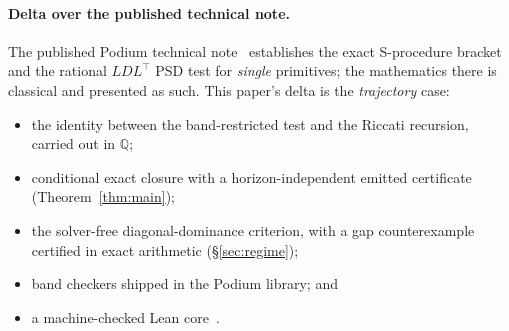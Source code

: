 \documentclass[11pt]{article}
\theoremstyle{definition}
\theoremstyle{remark}
\newcommand{\Q}{\mathbb{Q}}
\renewcommand{\_}{\ifdim\fontdimen3\font=0pt\relax\char`\_\else\textunderscore\fi\hspace{0pt}}
\begin{document}
\paragraph{Delta over the published technical note.} The published Podium
technical note~\cite{oltean2026certnote} establishes the exact S-procedure
bracket and the rational $LDL^\top$ PSD test for \emph{single} primitives; the
mathematics there is classical and presented as such. This paper's delta is
the \emph{trajectory} case:
\begin{itemize}
\item the identity between the band-restricted test and the Riccati recursion,
carried out in $\Q$;
\item conditional exact closure with a horizon-independent emitted certificate
(Theorem~\ref{thm:main});
\item the solver-free diagonal-dominance criterion, with a gap counterexample
certified in exact arithmetic (\S\ref{sec:regime});
\item band checkers shipped in the Podium library; and
\item a machine-checked Lean core~\cite{leannote}.
\end{itemize}
\end{document}
